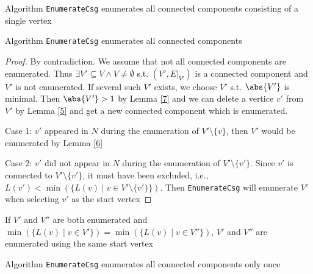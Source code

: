 \documentclass[11pt]{article}
\begin{document}
\begin{lemma}[]
\label{7}
Algorithm \texttt{EnumerateCsg} enumerates all connected components consisting of a single vertex
\end{lemma}

\begin{lemma}[]
Algorithm \texttt{EnumerateCsg} enumerates all connected components
\end{lemma}

\begin{proof}
By contradiction. We assume that not all connected components are enumerated. Thus
\(\exists V'\subseteq V\wedge V\neq\emptyset\) s.t. \((V',E|_{V'})\) is a connected component and
\(V'\) is not enumerated. If several such \(V'\) exists, we choose \(V'\) s.t. \(\abs{V'}\) is
minimal. Then \(\abs{V'}>1\) by Lemma \ref{7} and we can delete a vertice \(v'\) from \(V'\) by Lemma \ref{5} and
get a new connected component which is enumerated.

Case 1: \(v'\) appeared in \(N\) during the enumeration of \(V'\setminus\{v\}\), then \(V'\) would be
enumerated by Lemma \ref{6}

Case 2: \(v'\) did not appear in \(N\) during the enumeration of \(V'\setminus\{v'\}\). Since \(v'\)
is connected to \(V'\setminus\{v'\}\), it must have been excluded, i.e.,
\(L(v')<\min(\{L(v)\mid v\in V'\setminus\{v'\}\})\). Then \texttt{EnumerateCsg} will enumerate \(V'\) when
selecting \(v'\) as the start vertex
\end{proof}

\begin{lemma}[]
\label{9}
If \(V'\) and \(V''\) are both enumerated and
\(\min(\{L(v)\mid v\in V'\})=\min(\{L(v)\mid v\in V''\})\), \(V'\) and \(V''\) are enumerated using
the same start vertex
\end{lemma}

\begin{lemma}[]
\label{10}
Algorithm \texttt{EnumerateCsg} enumerates all connected components only once
\end{lemma}
\end{document}
